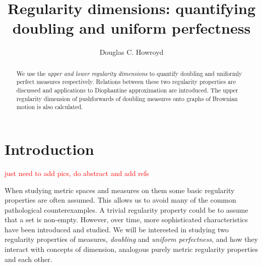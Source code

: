 \documentclass[12pt]{amsart}
\numberwithin{equation}{section}
\begin{document}
\title[quantifying doubling]{Regularity dimensions: quantifying doubling and uniform perfectness}



\author[D. C. Howroyd]{Douglas C. Howroyd}
\address{Douglas C. Howroyd\\
School of Mathematics \& Statistics\\University of St Andrews\\ St Andrews\\ KY16 9SS\\ UK  }
\curraddr{}








\begin{abstract}
We use the \emph{upper and lower regularity dimensions} to quantify doubling and uniformly perfect measures respectively. Relations between these two regularity properties are discussed and applications to Diophantine approximation are introduced. The upper regularity dimension of pushforwards of doubling measures onto graphs of Brownian motion is also calculated.
\end{abstract}


\maketitle




\section{Introduction} \label{intro}\label{intro}

\textcolor{red}{just need to add pics, do abstract and add refs}

When studying metric spaces and measures on them some basic regularity properties are often assumed. This allows us to avoid many of the common pathological counterexamples. A trivial regularity property could be to assume that a set is non-empty. However, over time, more sophisticated characteristics have been introduced and studied. We will be interested in studying two regularity properties of measures, \textit{doubling} and \textit{uniform perfectness}, and how they interact with concepts of dimension, analogous purely metric regularity properties and each other.
\end{document}
